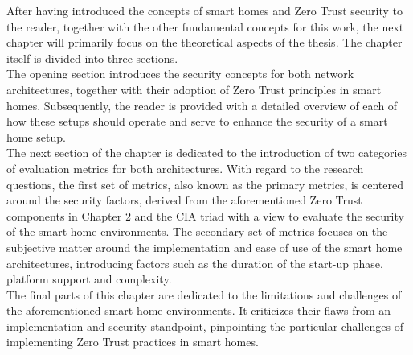 After having introduced the concepts of smart homes and Zero Trust security to the reader, together with the other fundamental concepts for this work, the next chapter will primarily focus on the theoretical aspects of the thesis. The chapter itself is divided into three sections.\\
The opening section introduces the security concepts for both network architectures, together with their adoption of Zero Trust principles in smart homes. Subsequently, the reader is provided with a detailed overview of each of how these setups should operate and serve to enhance the security of a smart home setup.\\
The next section of the chapter is dedicated to the introduction of two categories of evaluation metrics for both architectures. With regard to the research questions, the first set of metrics, also known as the primary metrics, is centered around the security factors, derived from the aforementioned Zero Trust components in Chapter 2 and the CIA triad\cite{cia_article} with a view to evaluate the security of the smart home environments. The secondary set of metrics focuses on the subjective matter around the implementation and ease of use of the smart home architectures, introducing factors such as the duration of the start-up phase, platform support and complexity.\\
The final parts of this chapter are dedicated to the limitations and challenges of the aforementioned smart home environments. It criticizes their flaws from an implementation and security standpoint, pinpointing the particular challenges of implementing Zero Trust practices in smart homes.\\\\\\\\\\\\\\

